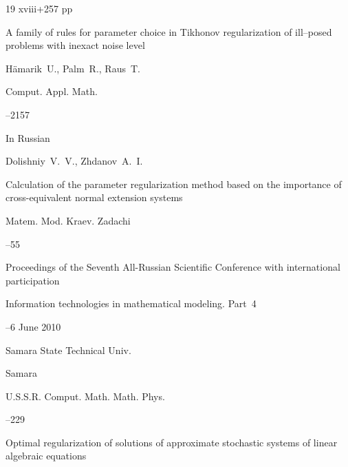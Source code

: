 \begin{thebibliography}{19}
\totalpages  xviii+257 pp \nofrills





\paper A family of rules for parameter choice in Tikhonov regularization of ill–posed problems with inexact noise level

\by H\"amarik~U., Palm~R., Raus~T.

\jour Comput. Appl. Math.




--2157





\lang In Russian

\by Dolishniy~V.~V., Zhdanov~A.~I.

\paper Calculation of the parameter regularization method based on the importance of cross-equivalent normal extension systems

\serial Matem. Mod. Kraev. Zadachi


--55

\inbook Proceedings of the Seventh  All-Russian Scientific Conference with international participation

\bookinfo Information technologies in mathematical modeling. \rm Part~4

–6 June 2010


\publ Samara State Technical Univ.

\publaddr Samara








\jour U.S.S.R. Comput. Math. Math. Phys.




--229

\paper Optimal regularization of solutions of approximate stochastic systems of linear algebraic equations


\end{thebibliography}
